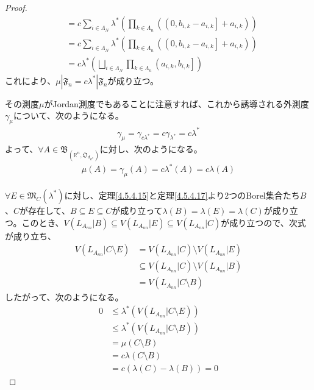 \documentclass[dvipdfmx]{jsarticle}
\begin{document}
\begin{proof}
\begin{align*}
&= c\sum_{i \in \varLambda_{N}} {\lambda^{*}\left( \prod_{k \in \varLambda_{n}} \left( \left( 0,b_{i,k} - a_{i,k} \right] + a_{i,k} \right) \right)}\\
&= c\sum_{i \in \varLambda_{N}} {\lambda^{*}\left( \prod_{k \in \varLambda_{n}} \left( \left( 0,b_{i,k} - a_{i,k} \right] + a_{i,k} \right) \right)}\\
&= c\lambda^{*}\left( \bigsqcup_{i \in \varLambda_{N}} {\prod_{k \in \varLambda_{n}} \left( a_{i,k},b_{i,k} \right]} \right)
\end{align*}
これにより、$\mu|\mathfrak{F}_{n} = c\lambda^{*}|\mathfrak{F}_{n}$が成り立つ。\par
その測度$\mu$がJordan測度でもあることに注意すれば、これから誘導される外測度$\gamma_{\mu}$について、次のようになる。
\begin{align*}
\gamma_{\mu} = \gamma_{c\lambda^{*}} = c\gamma_{\lambda^{*}} = c\lambda^{*}
\end{align*}
よって、$\forall A \in \mathfrak{B}_{\left( \mathbb{R}^{n},\mathfrak{O}_{d_{E^{n}}} \right)}$に対し、次のようになる。
\begin{align*}
\mu(A) = \gamma_{\mu}(A) = c\lambda^{*}(A) = c\lambda(A)
\end{align*}\par
$\forall E \in \mathfrak{M}_{C}\left( \lambda^{*} \right)$に対し、定理\ref{4.5.4.15}と定理\ref{4.5.4.17}より2つのBorel集合たち$B$、$C$が存在して、$B \subseteq E \subseteq C$が成り立って$\lambda(B) = \lambda(E) = \lambda(C)$が成り立つ。このとき、$V\left( L_{A_{nn}}|B \right) \subseteq V\left( L_{A_{nn}}|E \right) \subseteq V\left( L_{A_{nn}}|C \right)$が成り立つので、次式が成り立ち、
\begin{align*}
V\left( L_{A_{nn}}|C \setminus E \right) &= V\left( L_{A_{nn}}|C \right) \setminus V\left( L_{A_{nn}}|E \right)\\
&\subseteq V\left( L_{A_{nn}}|C \right) \setminus V\left( L_{A_{nn}}|B \right)\\
&= V\left( L_{A_{nn}}|C \setminus B \right)
\end{align*}
したがって、次のようになる。
\begin{align*}
0 &\leq \lambda^{*}\left( V\left( L_{A_{nn}}|C \setminus E \right) \right)\\
&\leq \lambda^{*}\left( V\left( L_{A_{nn}}|C \setminus B \right) \right)\\
&= \mu(C \setminus B)\\
&= c\lambda(C \setminus B)\\
&= c\left( \lambda(C) - \lambda(B) \right) = 0

\end{align*}
\end{proof}
\end{document}
